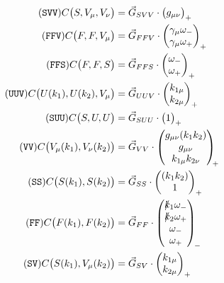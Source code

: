 \documentclass[twoside,12pt]{article}
\renewcommand{\arraystretch}{1.2}
\def\pslash#1{\rlap{/}#1}
\def\Code#1{\ensuremath{\texttt{#1}}}
\begin{document}
\begin{appendix}
\begin{align}
\tag{\Code{SVV}}
C\bigl(S, V_\mu, V_\nu\bigr) &= \vec G_{SVV} \cdot
	\begin{pmatrix}
	g_{\mu\nu}
	\end{pmatrix}_+
\\
\tag{\Code{FFV}}
C\bigl(F, F, V_\mu\bigr) &= \vec G_{FFV} \cdot
	\begin{pmatrix}
	\gamma_\mu \omega_- \\
	\gamma_\mu \omega_+
	\end{pmatrix}_+
\\
\tag{\Code{FFS}}
C\bigl(F, F, S\bigr) &= \vec G_{FFS} \cdot
	\begin{pmatrix}
	\omega_- \\
	\omega_+
	\end{pmatrix}_+
\\
\tag{\Code{UUV}}
C\bigl(U(k_1), U(k_2), V_\mu \bigr) &= \vec G_{UUV} \cdot
	\begin{pmatrix}
	k_{1\mu} \\
	k_{2\mu}
	\end{pmatrix}_+
\\
\tag{\Code{SUU}}
C\bigl(S, U, U\bigr) &= \vec G_{SUU} \cdot
	\begin{pmatrix}
	1
	\end{pmatrix}_+
\\
\tag{\Code{VV}}
C\bigl(V_\mu(k_1), V_\nu(k_2)\bigr) &= \vec G_{VV} \cdot
	\begin{pmatrix}
	g_{\mu\nu} (k_1 k_2) \\
	g_{\mu\nu} \\
	k_{1\mu} k_{2\nu}
	\end{pmatrix}_{\!\!+}
\\
\tag{\Code{SS}}
C\bigl(S(k_1), S(k_2)\bigr) &= \vec G_{SS} \cdot
	\begin{pmatrix}
	(k_1 k_2) \\
	1
	\end{pmatrix}_+
\\
\tag{\Code{FF}}
C\bigl(F(k_1), F(k_2)\bigr) &= \vec G_{FF} \cdot
	\begin{pmatrix}
	\pslash{k}_1 \omega_- \\
	\pslash{k}_2 \omega_+ \\
	\omega_- \\
	\omega_+
	\end{pmatrix}_{\!-}
\\
\tag{\Code{SV}}
C\bigl(S(k_1), V_\mu(k_2)\bigr) &= \vec G_{SV} \cdot 
	\begin{pmatrix}
	k_{1\mu} \\
	k_{2\mu}
	\end{pmatrix}_+
\end{align}
\renewcommand{\arraystretch}{1.2}



\end{appendix}
\end{document}
